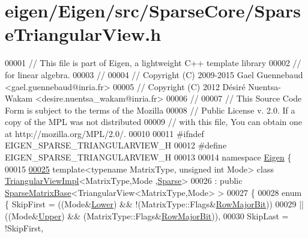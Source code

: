\hypertarget{eigen_2_eigen_2src_2_sparse_core_2_sparse_triangular_view_8h_source}{}\section{eigen/\+Eigen/src/\+Sparse\+Core/\+Sparse\+Triangular\+View.h}
\label{eigen_2_eigen_2src_2_sparse_core_2_sparse_triangular_view_8h_source}

\begin{DoxyCode}
00001 \textcolor{comment}{// This file is part of Eigen, a lightweight C++ template library}
00002 \textcolor{comment}{// for linear algebra.}
00003 \textcolor{comment}{//}
00004 \textcolor{comment}{// Copyright (C) 2009-2015 Gael Guennebaud <gael.guennebaud@inria.fr>}
00005 \textcolor{comment}{// Copyright (C) 2012 Désiré Nuentsa-Wakam <desire.nuentsa\_wakam@inria.fr>}
00006 \textcolor{comment}{//}
00007 \textcolor{comment}{// This Source Code Form is subject to the terms of the Mozilla}
00008 \textcolor{comment}{// Public License v. 2.0. If a copy of the MPL was not distributed}
00009 \textcolor{comment}{// with this file, You can obtain one at http://mozilla.org/MPL/2.0/.}
00010 
00011 \textcolor{preprocessor}{#ifndef EIGEN\_SPARSE\_TRIANGULARVIEW\_H}
00012 \textcolor{preprocessor}{#define EIGEN\_SPARSE\_TRIANGULARVIEW\_H}
00013 
00014 \textcolor{keyword}{namespace }\hyperlink{namespace_eigen}{Eigen} \{
00015 
\hyperlink{group___sparse_core___module}{00025} \textcolor{keyword}{template}<\textcolor{keyword}{typename} MatrixType, \textcolor{keywordtype}{unsigned} \textcolor{keywordtype}{int} Mode> \textcolor{keyword}{class }\hyperlink{class_eigen_1_1_triangular_view_impl}{TriangularViewImpl}<MatrixType,Mode
      ,\hyperlink{struct_eigen_1_1_sparse}{Sparse}>
00026   : \textcolor{keyword}{public} \hyperlink{group___sparse_core___module_class_eigen_1_1_sparse_matrix_base}{SparseMatrixBase}<TriangularView<MatrixType,Mode> >
00027 \{
00028     \textcolor{keyword}{enum} \{ SkipFirst = ((Mode&\hyperlink{group__enums_gga39e3366ff5554d731e7dc8bb642f83cda891792b8ed394f7607ab16dd716f60e6}{Lower}) && !(MatrixType::Flags&\hyperlink{group__flags_gae4f56c2a60bbe4bd2e44c5b19cbe8762}{RowMajorBit}))
00029                     || ((Mode&\hyperlink{group__enums_gga39e3366ff5554d731e7dc8bb642f83cda6bcb58be3b8b8ec84859ce0c5ac0aaec}{Upper}) &&  (MatrixType::Flags&\hyperlink{group__flags_gae4f56c2a60bbe4bd2e44c5b19cbe8762}{RowMajorBit})),
00030            SkipLast = !SkipFirst,

\end{DoxyCode}
